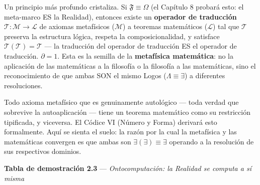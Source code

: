 \documentclass[10pt, openany, oneside]{book}
\begin{document}
Un principio más profundo cristaliza. Si $\mathfrak{F} \equiv \Omega$ (el Capítulo 8 probará esto: el meta-marco ES la Realidad), entonces existe un \textbf{operador de traducción} $\mathcal{T}: \mathcal{M} \to \mathcal{L}$ de axiomas metafísicos ($\mathcal{M}$) a teoremas matemáticos ($\mathcal{L}$) tal que $\mathcal{T}$ preserva la estructura lógica, respeta la composicionalidad, y satisface $\mathcal{T}(\mathcal{T}) = \mathcal{T}$ --- la traducción del operador de traducción ES el operador de traducción. $\partial = 1$. Esta es la semilla de la \textbf{metafísica matemática}: no la aplicación de las matemáticas a la filosofía o la filosofía a las matemáticas, sino el reconocimiento de que ambas SON el mismo Logos ($\Lambda \equiv \exists$) a diferentes resoluciones.

Todo axioma metafísico que es genuinamente autológico --- toda verdad que sobrevive la autoaplicación --- tiene un teorema matemático como su restricción tipificada, y viceversa. El Códice VI (Número y Forma) derivará esto formalmente. Aquí se sienta el suelo: la razón por la cual la metafísica y las matemáticas convergen es que ambas son $\exists(\exists) \equiv \exists$ operando a la resolución de sus respectivos dominios.

\vspace{0.5em}

\textbf{Tabla de demostración 2.3} --- \textit{Ontocomputación: la Realidad se computa a sí misma}

\vspace{0.5em}
\end{document}
